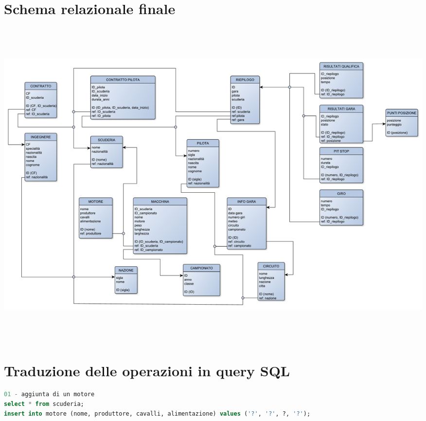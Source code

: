 \documentclass[a4paper,12pt]{report}
\begin{document}
{		\section{Schema relazionale finale}
			\pagebreak
			\begin{center}
							\hspace*{-2cm}%
							\includegraphics[width=\dimexpr\textwidth+7cm\relax, height=17cm, angle=90]{copies/schemaFinale.pdf}%
							\hspace*{-8cm}%
						\end{center}
					\pagebreak
		\section{Traduzione delle operazioni in query SQL}
			\begin{adjustwidth}{-85pt}{1pt}
			\begin{lstlisting}[language=SQL]
01 - aggiunta di un motore
select * from scuderia;
insert into motore (nome, produttore, cavalli, alimentazione) values ('?', '?', ?, '?');



\end{lstlisting}
\end{adjustwidth}}
\end{document}
